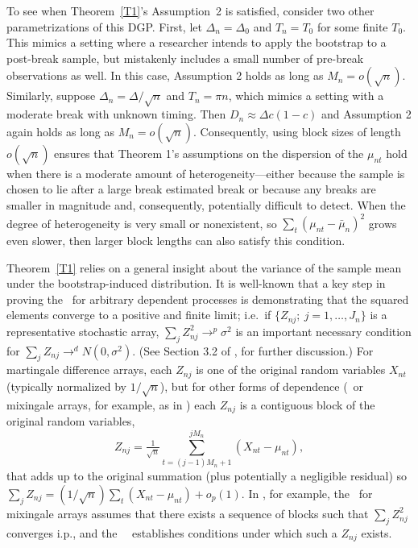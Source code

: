 \documentclass[11pt]{article}
\begin{document}
To see when Theorem~\ref{T1}'s Assumption~2 is satisfied, consider two
other parametrizations of this DGP. First, let $\Delta_n = \Delta_0$
and $T_n = T_0$ for some finite $T_0$. This mimics a setting where a
researcher intends to apply the bootstrap to a post-break sample, but
mistakenly includes a small number of pre-break observations as
well. In this case, Assumption 2 holds as long as
$M_n = o(\sqrt{n})$.  Similarly, suppose
$\Delta_n = \Delta / \sqrt{n}$ and $T_n = \pi n$, which mimics a
setting with a moderate break with unknown timing.  Then
$D_n \approx \Delta c (1 - c)$ and Assumption 2 again holds as long as
$M_n = o(\sqrt{n})$. Consequently, using block sizes of length
$o(\sqrt{n})$ ensures that Theorem 1's assumptions on the dispersion
of the $\mu_{nt}$ hold when there is a moderate amount of
heterogeneity---either because the sample is chosen to lie after a
large break estimated break or because any breaks are smaller in
magnitude and, consequently, potentially difficult to detect. When the
degree of heterogeneity is very small or nonexistent, so
$\sum_t (\mu_{nt} - \bar \mu_n)^2$ grows even slower, then larger
block lengths can also satisfy this condition.

Theorem~\ref{T1} relies on a general insight about the
variance of the sample mean under the bootstrap-induced
distribution. It is well-known that a key step in proving the \clt\
for arbitrary dependent processes is demonstrating that the squared
elements converge to a positive and finite limit; i.e.\ if
$\{Z_{nj};~j=1,\dots,J_n\}$ is a representative stochastic array,
$\sum_j Z_{nj}^2 \to^p \sigma^2$ is an important necessary condition
for $\sum_j Z_{nj} \to^d N(0,\sigma^2)$.  (See Section 3.2 of
\citealp{HaH:80}, for further discussion.)  For martingale difference
arrays, each $Z_{nj}$ is one of the original random variables $X_{nt}$
(typically normalized by $1/\sqrt{n}$), but for other forms of
dependence (\ned\ or mixingale arrays, for example, as in
\citealp{Jon:97}) each $Z_{nj}$ is a contiguous block of the original
random variables,
\begin{equation*}
  Z_{nj} = \tfrac{1}{\sqrt{n}} \sum_{t=(j-1) M_n +1}^{j M_n} (X_{nt} - \mu_{nt}),
\end{equation*}
that adds up to the original summation (plus potentially a negligible
residual) so $\sum_j Z_{nj}= (1/\sqrt{n}) \sum_t (X_{nt} - \mu_{nt}) +
o_p(1)$. In \citet{Jon:97}, for example, the \clt\ for mixingale
arrays assumes that there exists a sequence of blocks such that $\sum_j
Z_{nj}^2$ converges i.p., and the \ned\ \clt\ establishes conditions
under which such a $Z_{nj}$ exists.
\end{document}
